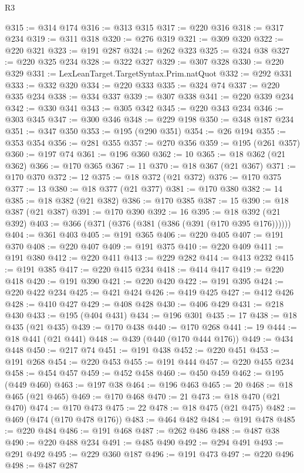\begin{lexlean}{R3}
\begin{coremodule}
@315 := @314 @174
@316 := @313 @315
@317 := @220 @316
@318 := @317 @234
@319 := @311 @318
@320 := @276 @319
@321 := @309 @320
@322 := @220 @321
@323 := @191 @287
@324 := @262 @323
@325 := @324 @38
@327 := @220 @325 @234
@328 := @322 @327
@329 := @307 @328
@330 := @220 @329
@331 := LexLeanTarget.TargetSyntax.Prim.natQuot
@332 := @292 @331
@333 := @332 @320
@334 := @220 @333
@335 := @324 @74
@337 := @220 @335 @234
@338 := @334 @337
@339 := @307 @338
@341 := @220 @339 @234
@342 := @330 @341
@343 := @305 @342
@345 := @220 @343 @234
@346 := @303 @345
@347 := @300 @346
@348 := @229 @198
@350 := @348 @187 @234
@351 := @347 @350
@353 := @195 (@290 @351)
@354 := @26 @194
@355 := @353 @354
@356 := @281 @355
@357 := @270 @356
@359 := @195 (@261 @357)
@360 := @197 @74
@361 := @196 @360
@362 := 10
@365 := @18 @362 (@21 @362)
@366 := @170 @365
@367 := 11
@370 := @18 @367 (@21 @367)
@371 := @170 @370
@372 := 12
@375 := @18 @372 (@21 @372)
@376 := @170 @375
@377 := 13
@380 := @18 @377 (@21 @377)
@381 := @170 @380
@382 := 14
@385 := @18 @382 (@21 @382)
@386 := @170 @385
@387 := 15
@390 := @18 @387 (@21 @387)
@391 := @170 @390
@392 := 16
@395 := @18 @392 (@21 @392)
@403 := @366 (@371 (@376 (@381 (@386 (@391 (@170 @395 @176))))))
@404 := @361 @403
@405 := @191 @365
@406 := @220 @405
@407 := @191 @370
@408 := @220 @407
@409 := @191 @375
@410 := @220 @409
@411 := @191 @380
@412 := @220 @411
@413 := @229 @282
@414 := @413 @232
@415 := @191 @385
@417 := @220 @415 @234
@418 := @414 @417
@419 := @220 @418
@420 := @191 @390
@421 := @220 @420
@422 := @191 @395
@424 := @220 @422 @234
@425 := @421 @424
@426 := @419 @425
@427 := @412 @426
@428 := @410 @427
@429 := @408 @428
@430 := @406 @429
@431 := @218 @430
@433 := @195 (@404 @431)
@434 := @196 @301
@435 := 17
@438 := @18 @435 (@21 @435)
@439 := @170 @438
@440 := @170 @268
@441 := 19
@444 := @18 @441 (@21 @441)
@448 := @439 (@440 (@170 @444 @176))
@449 := @434 @448
@450 := @217 @74
@451 := @191 @438
@452 := @220 @451
@453 := @191 @268
@454 := @220 @453
@455 := @191 @444
@457 := @220 @455 @234
@458 := @454 @457
@459 := @452 @458
@460 := @450 @459
@462 := @195 (@449 @460)
@463 := @197 @38
@464 := @196 @463
@465 := 20
@468 := @18 @465 (@21 @465)
@469 := @170 @468
@470 := 21
@473 := @18 @470 (@21 @470)
@474 := @170 @473
@475 := 22
@478 := @18 @475 (@21 @475)
@482 := @469 (@474 (@170 @478 @176))
@483 := @464 @482
@484 := @191 @478
@485 := @220 @484
@486 := @191 @468
@487 := @262 @486
@488 := @487 @38
@490 := @220 @488 @234
@491 := @485 @490
@492 := @294 @491
@493 := @291 @492
@495 := @229 @360 @187
@496 := @191 @473
@497 := @220 @496
@498 := @487 @287

\end{coremodule}
\end{lexlean}
